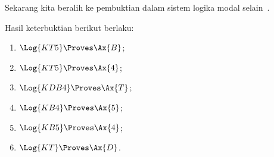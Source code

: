 \documentclass[../../../include/open-logic-section]{subfiles}
\begin{document}


Sekarang kita beralih ke pembuktian dalam sistem logika modal selain~.

\begin{prop}
Hasil keterbuktian berikut berlaku:
  \begin{enumerate}
  \item $\Log{KT5} \Proves \Ax{B}$;
  \item $\Log{KT5} \Proves \Ax{4}$;
  \item $\Log{KDB4} \Proves \Ax{T}$;
  \item $\Log{KB4} \Proves \Ax{5}$;
  \item $\Log{KB5} \Proves \Ax{4}$;
  \item {}$\Log{KT} \Proves \Ax{D}$.
  \end{enumerate}
\end{prop}
\end{document}
